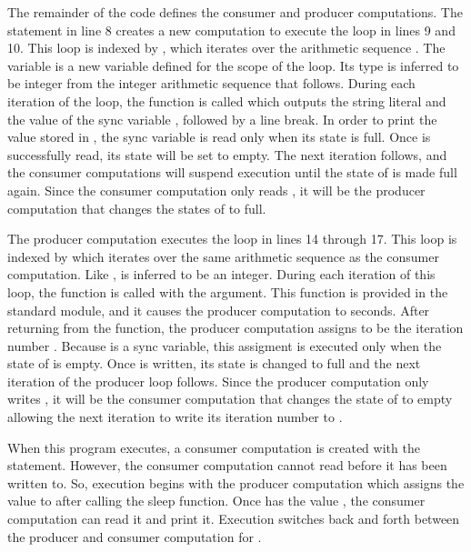 The remainder of the code defines the consumer and producer computations.
The  statement in line 8 creates a new computation to execute the 
loop in lines 9 and 10.  This loop is indexed by , which iterates over
the arithmetic sequence .  The variable  is a new
variable defined for the scope of the loop.  Its type is inferred to be integer from
the integer arithmetic sequence that follows.  During each iteration of the 
loop, the  function is called which outputs the string
literal  and the value of the sync variable , 
followed by a line break.  In order to print the value stored in , the
sync variable is read only when its state is full.  Once  is successfully
read, its state will be set to empty.  The next iteration follows, and the 
consumer computations will suspend execution until the state of  is 
made full again.  Since the consumer computation only reads , it will be 
the producer computation that changes the states of  to full.

The producer computation executes the  loop in lines 14 through 17.  This
loop is indexed by  which iterates over the same arithmetic sequence
as the consumer computation.  Like ,  is inferred to be an integer.
During each iteration of this  loop, the  function is
called with the argument.  This  function is provided
in the  standard module, and it causes the producer computation to
 seconds.  After returning from the  function, 
the producer computation assigns  to be the iteration number .  
Because  is a sync variable, this assigment is executed only when the state of 
 is empty.  Once  is written, its state is changed to full and the
next iteration of the producer loop follows.  Since the producer computation only
writes , it will be the consumer computation that changes the state of
 to empty allowing the next iteration to write its iteration number
to .

When this program executes, a consumer computation is created with the 
statement.
However, the consumer computation cannot read  before it has been written
to.  So, execution begins with the producer computation which assigns the value
 to  after calling the sleep function.  Once  has the
value , the consumer computation can read it and print it.  Execution
switches back and forth between the producer and consumer computation for
.  

